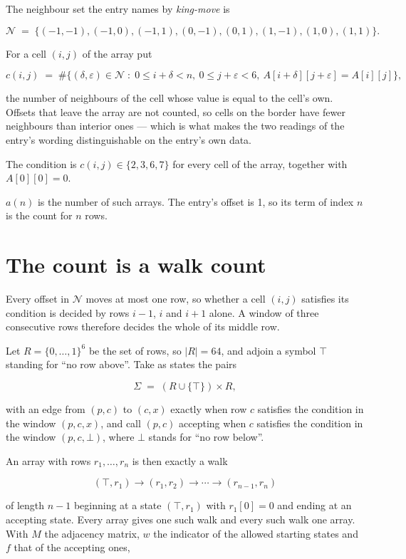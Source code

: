 \documentclass[11pt]{article}
\theoremstyle{definition}
\begin{document}
The neighbour set the entry names by {\itshape king-move} is

\[\mathcal{N} \;=\; \{(-1,-1), (-1,0), (-1,1), (0,-1), (0,1), (1,-1), (1,0), (1,1)\}.\]

For a cell $(i,j)$ of the array put

\[c(i,j) \;=\; \#\bigl\{(\delta,\varepsilon)\in\mathcal{N} \;:\; 0\le i+\delta<n,\ 0\le j+\varepsilon<6,\ A[i+\delta][j+\varepsilon] = A[i][j]\bigr\},\]

the number of neighbours of the cell whose value is equal to the cell's own. Offsets that leave the array are not counted, so cells on the border have fewer neighbours than interior ones --- which is what makes the two readings of the entry's wording distinguishable on the entry's own data.

The condition is $c(i,j) \in \{2, 3, 6, 7\}$ for every cell of the array, together with $A[0][0]=0$.

$a(n)$ is the number of such arrays. The entry's offset is 1, so its term of index $n$ is the count for $n$ rows.

\section{The count is a walk count}

Every offset in $\mathcal{N}$ moves at most one row, so whether a cell $(i,j)$ satisfies its condition is decided by rows $i-1$, $i$ and $i+1$ alone. A window of three consecutive rows therefore decides the whole of its middle row.

Let $R = \{0,\dots,1\}^{6}$ be the set of rows, so $|R| = 64$, and adjoin a symbol $\top$ standing for ``no row above''. Take as states the pairs

\[\Sigma \;=\; (R \cup \{\top\}) \times R,\]

with an edge from $(p,c)$ to $(c,x)$ exactly when row $c$ satisfies the condition in the window $(p,c,x)$, and call $(p,c)$ accepting when $c$ satisfies the condition in the window $(p,c,\bot)$, where $\bot$ stands for ``no row below''.

An array with rows $r_1,\dots,r_n$ is then exactly a walk

\[(\top,r_1) \to (r_1,r_2) \to \cdots \to (r_{n-1},r_n)\]

of length $n-1$ beginning at a state $(\top,r_1)$ with $r_1[0]=0$ and ending at an accepting state. Every array gives one such walk and every such walk one array. With $M$ the adjacency matrix, $w$ the indicator of the allowed starting states and $f$ that of the accepting ones,
\end{document}
